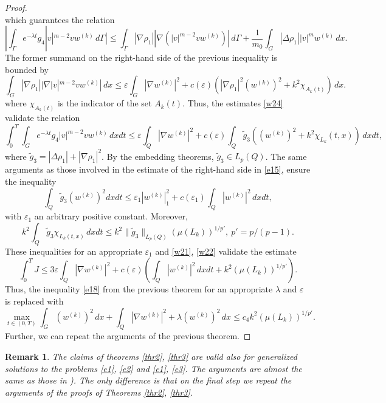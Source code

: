 \documentclass{article}
\theoremstyle{plain}
\newtheorem{remark}{Remark}
\begin{document}
\begin{proof}
\begin{equation*}
\end{equation*}
which guarantees the relation
\begin{equation*}
 |\int_{\Gamma}e^{-\lambda t} g_4 |v|^{m-2} v w^{(k)}\,d\Gamma|  \leq 
 \int_{\Gamma}|\nabla \rho_1| |\nabla ( |v|^{m-2}v w^{(k)})|\,d\Gamma + \frac{1}{m_0}\int_G |\Delta\rho_1|  |v|^{m} w^{(k)}\,dx.
 \end{equation*}
The former  summand on the right-hand side of the previous inequality is bounded  by 
\begin{equation}\label{w24}
 \int_{G}|\nabla \rho_1| |\nabla |v|^{m-2}v w^{(k)}|\,dx\leq  \varepsilon \int_{G} |\nabla w^{(k)}|^2  + c(\varepsilon) (|\nabla \rho_1|^2 (w^{(k)})^2 + k^2\chi_{A_k(t)})\,dx.
\end{equation}
where $\chi_{A_k(t)}$ is the indicator of the set  $A_k(t)$.
Thus, the estimates   \eqref{w24} validate the relation
$$
\int_0^T \int_Ge^{-\lambda t} g_4 |v|^{m-2} v w^{(k)}\,dxdt \leq \varepsilon \int_{Q}|\nabla w^{(k)}|^2 + c(\varepsilon) \int_Q\tilde{g}_3( (w^{(k)})^2 +k^2\chi_{L_k}(t,x))\,dxdt,
$$
 where  $\tilde{g}_3=|\Delta \rho_1|+|\nabla \rho_1|^2$.
By the embedding theorems,  $\tilde{g}_3\in L_p(Q)$.  
The same arguments as those involved in the estimate of the right-hand side 
in \eqref{e15},  ensure the inequality
 $$
 \int_Q\tilde{g}_3 (w^{(k)})^2dxdt\leq \varepsilon_1 |w^{(k)}|_1^2  + c(\varepsilon_1) \int_Q |w^{(k)}|^2\,dxdt, 
$$
with $\varepsilon_1$ an arbitrary positive constant.
Moreover, 
 $$
 k^2 \int_Q \tilde{g}_3 \chi_{L_k(t,x)} \,dxdt\leq k^2\|\tilde{g}_3\|_{L_p(Q)}(\mu(L_k))^{1/p'},\  p'=p/(p-1). 
$$ 
These inequalities  for an appropriate  $\varepsilon_1$  and \eqref{w21}, \eqref{w22} validate the estimate 
$$
\int_0^T J\leq 3\varepsilon \int_{Q} |\nabla w^{(k)}|^2 + c(\varepsilon)( \int_Q |w^{(k)}|^2\,dxdt + k^2 (\mu(L_k))^{1/p'}).
$$
Thus, the inequality  \eqref{e18} from the previous theorem for an appropriate  $\lambda$ and $\varepsilon$ is replaced with 
 \begin{equation}\label{w25}
\max_{t\in (0,T)} \int_{G} (w^{(k)})^2\,dx +
\int_{Q} |\nabla w^{(k)}|^2+ \lambda  (w^{(k)})^2\,dx \leq  c_4 k^2 (\mu(L_k))^{1/p'}.
\end{equation} 
     Further, we can repeat the arguments of the previous theorem.  
\end{proof} 

\begin{remark} \label{rem11} The claims of theorems \ref{thr2}, \ref{thr3} are valid also for generalized solutions to the problems \eqref{e1}, \eqref{e2} and   
\eqref{e1}, \eqref{e3}. The arguments are almost the same as those in  \cite[Sect. 1,2 of Ch. 5]{lad}). The only difference is that on the final step we repeat the arguments of the proofs of Theorems \ref{thr2}, \ref{thr3}.  
\end{remark} 
\end{document}
